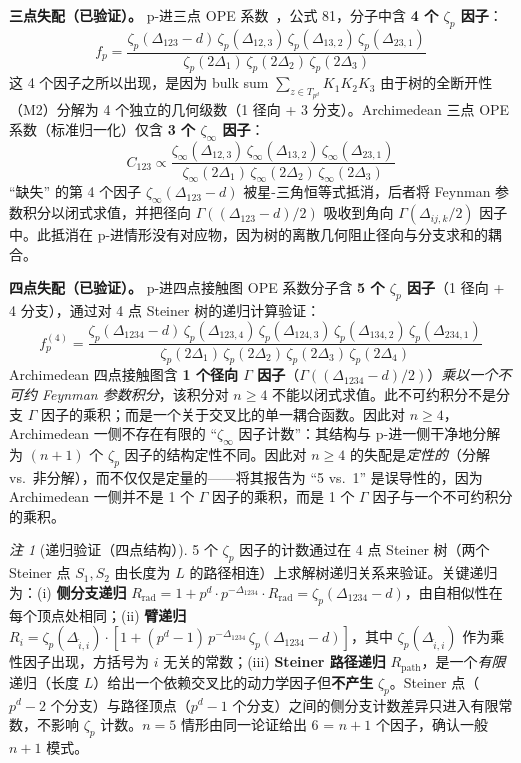 \documentclass[11pt,a4paper]{ctexart}
\theoremstyle{remark}
\newtheorem{remark}[theorem]{注}
\begin{document}
\medskip\noindent
\textbf{三点失配（已验证）。}
p-进三点 OPE 系数~\cite{HJ24}，公式 81，分子中含 \textbf{4 个 $\zeta_p$ 因子}：
\begin{equation}
f_p = \frac{\zeta_p(\Delta_{123}{-}d)\,\zeta_p(\Delta_{12,3})\,\zeta_p(\Delta_{13,2})\,\zeta_p(\Delta_{23,1})}{\zeta_p(2\Delta_1)\,\zeta_p(2\Delta_2)\,\zeta_p(2\Delta_3)}
\end{equation}
这 4 个因子之所以出现，是因为 bulk sum $\sum_{z \in T_{p^d}} K_1 K_2 K_3$ 由于树的全断开性（M2）分解为 4 个独立的几何级数（1 径向 + 3 分支）。Archimedean 三点 OPE 系数（标准归一化）仅含 \textbf{3 个 $\zeta_\infty$ 因子}：
\begin{equation}
C_{123} \propto \frac{\zeta_\infty(\Delta_{12,3})\,\zeta_\infty(\Delta_{13,2})\,\zeta_\infty(\Delta_{23,1})}{\zeta_\infty(2\Delta_1)\,\zeta_\infty(2\Delta_2)\,\zeta_\infty(2\Delta_3)}
\end{equation}
``缺失'' 的第 4 个因子 $\zeta_\infty(\Delta_{123}{-}d)$ 被星-三角恒等式抵消，后者将 Feynman 参数积分以闭式求值，并把径向 $\Gamma((\Delta_{123}{-}d)/2)$ 吸收到角向 $\Gamma(\Delta_{ij,k}/2)$ 因子中。此抵消在 p-进情形没有对应物，因为树的离散几何阻止径向与分支求和的耦合。

\medskip\noindent
\textbf{四点失配（已验证）。}
p-进四点接触图 OPE 系数分子含 \textbf{5 个 $\zeta_p$ 因子}（1 径向 + 4 分支），通过对 4 点 Steiner 树的递归计算验证：
\begin{equation}
f_p^{(4)} = \frac{\zeta_p(\Delta_{1234}{-}d)\,\zeta_p(\Delta_{123,4})\,\zeta_p(\Delta_{124,3})\,\zeta_p(\Delta_{134,2})\,\zeta_p(\Delta_{234,1})}{\zeta_p(2\Delta_1)\,\zeta_p(2\Delta_2)\,\zeta_p(2\Delta_3)\,\zeta_p(2\Delta_4)}
\end{equation}
Archimedean 四点接触图含 \textbf{1 个径向 $\Gamma$ 因子}（$\Gamma((\Delta_{1234}{-}d)/2)$）\emph{乘以一个不可约 Feynman 参数积分}，该积分对 $n \geq 4$ 不能以闭式求值。此不可约积分不是分支 $\Gamma$ 因子的乘积；而是一个关于交叉比的单一耦合函数。因此对 $n \geq 4$，Archimedean 一侧不存在有限的 ``$\zeta_\infty$ 因子计数''：其结构与 p-进一侧干净地分解为 $(n{+}1)$ 个 $\zeta_p$ 因子的结构定性不同。因此对 $n \geq 4$ 的失配是\emph{定性的}（分解 vs.\ 非分解），而不仅仅是定量的——将其报告为 ``5 vs.\ 1'' 是误导性的，因为 Archimedean 一侧并不是 1 个 $\Gamma$ 因子的乘积，而是 1 个 $\Gamma$ 因子与一个不可约积分的乘积。

\begin{remark}[递归验证（四点结构）]
5 个 $\zeta_p$ 因子的计数通过在 4 点 Steiner 树（两个 Steiner 点 $S_1, S_2$ 由长度为 $L$ 的路径相连）上求解树递归关系来验证。关键递归为：(i) \textbf{侧分支递归} $R_{\text{rad}} = 1 + p^d \cdot p^{-\Delta_{1234}} \cdot R_{\text{rad}} = \zeta_p(\Delta_{1234}{-}d)$，由自相似性在每个顶点处相同；(ii) \textbf{臂递归} $R_i = \zeta_p(\Delta_{\hat{i},i}) \cdot [1 + (p^d{-}1)\,p^{-\Delta_{1234}}\,\zeta_p(\Delta_{1234}{-}d)]$，其中 $\zeta_p(\Delta_{\hat{i},i})$ 作为乘性因子出现，方括号为 $i$ 无关的常数；(iii) \textbf{Steiner 路径递归} $R_{\text{path}}$，是一个\emph{有限}递归（长度 $L$）给出一个依赖交叉比的动力学因子但\textbf{不产生} $\zeta_p$。Steiner 点（$p^d{-}2$ 个分支）与路径顶点（$p^d{-}1$ 个分支）之间的侧分支计数差异只进入有限常数，不影响 $\zeta_p$ 计数。$n = 5$ 情形由同一论证给出 6 = $n{+}1$ 个因子，确认一般 $n{+}1$ 模式。
\end{remark}
\end{document}

